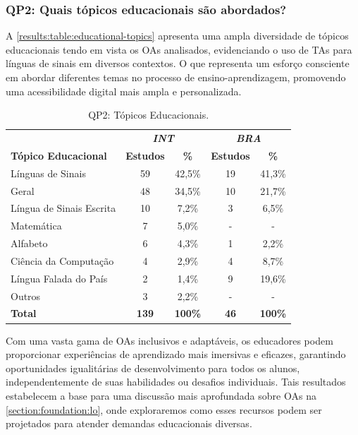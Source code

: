 \subsubsection{QP2: Quais tópicos educacionais são abordados?}

A \autoref{results:table:educational-topics} apresenta uma ampla diversidade de tópicos educacionais tendo em vista os OAs analisados, evidenciando o uso de TAs para línguas de sinais em diversos contextos. O que representa um esforço consciente em abordar diferentes temas no processo de ensino-aprendizagem, promovendo uma acessibilidade digital mais ampla e personalizada. 

\begin{table}[htb]
\caption{QP2: Tópicos Educacionais.}
\label{results:table:educational-topics}
\centering
\begin{tabular}{l|cc|cc} \hline
 & \multicolumn{2}{c|}{\textit{\textbf{INT}}} & \multicolumn{2}{c}{\textit{\textbf{BRA}}} \\ \cline{2-5} 
\textbf{Tópico Educacional} & \textbf{Estudos} & \textbf{\%} & \textbf{Estudos} & \textbf{\%} \\ \hline
Línguas de Sinais & 59 & 42,5\% & 19 & 41,3\% \\
Geral & 48 & 34,5\% & 10 & 21,7\% \\
Língua de Sinais Escrita & 10 & 7,2\% & 3 & 6,5\% \\
Matemática & 7 & 5,0\% & - & - \\
Alfabeto & 6 & 4,3\% & 1 & 2,2\% \\
Ciência da Computação & 4 & 2,9\% & 4 & 8,7\% \\
Língua Falada do País & 2 & 1,4\% & 9 & 19,6\% \\
Outros & 3 & 2,2\% & - & - \\ \hline
\textbf{Total} & \textbf{139} & \textbf{100\%} & \textbf{46} & \textbf{100\%} \\ \hline
\end{tabular}
\end{table}

Com uma vasta gama de OAs inclusivos e adaptáveis, os educadores podem proporcionar experiências de aprendizado mais imersivas e eficazes, garantindo oportunidades igualitárias de desenvolvimento para todos os alunos, independentemente de suas habilidades ou desafios individuais. Tais resultados estabelecem a base para uma discussão mais aprofundada sobre OAs na \autoref{section:foundation:lo}, onde exploraremos como esses recursos podem ser projetados para atender demandas educacionais diversas.


